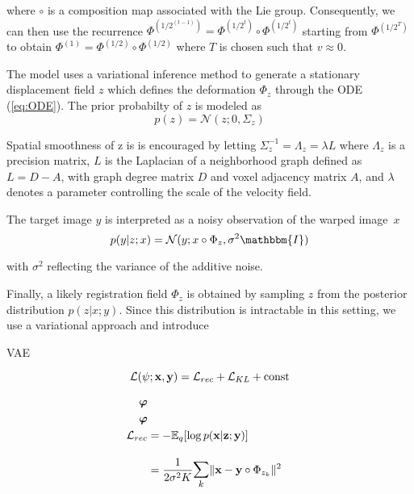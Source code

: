 where $\circ$ is a composition map associated with the Lie group. Consequently, we can then use the recurrence $\Phi^{(1/2^{(t-1)})} = \Phi^{(1/2^{t})} \circ \Phi^{(1/2^{t})}$ starting from $\Phi^{(1/2^T)}$ to obtain $\Phi^{(1)} = \Phi^{(1/2)} \circ \Phi^{(1/2)}$ where $T$ is chosen such that $v \approx 0$.

The model uses a variational inference method to generate a stationary displacement field $z$ which defines the deformation $\Phi_z$ through the ODE (\ref{eq:ODE}). The prior probabilty of $z$ is modeled as
\begin{equation}
	p(z) = \mathcal{N}(z; 0, \Sigma_z)
\end{equation}

Spatial smoothness of z is is encouraged by letting ${\Sigma_z^{-1} = \Lambda_z = \lambda L}$ where $\Lambda_z$ is a precision matrix, $L$ is the Laplacian of a neighborhood graph defined as $L = D - A$, with graph degree matrix $D$ and voxel adjacency matrix $A$, and $\lambda$ denotes a parameter controlling the scale of the velocity field.

The target image $y$ is interpreted as a noisy observation of the warped image~$x$
\begin{equation}
	p(y|z;x) = \mathcal{N}(y; x \circ \Phi_z, \sigma^2 \mathbbm{I})
\end{equation}

with $\sigma^2$ reflecting the variance of the additive noise.

Finally, a likely registration field $\Phi_z$ is obtained by sampling $z$ from the posterior distribution $p(z | x; y)$. Since this distribution is intractable in this setting, we use a variational approach and introduce 

VAE

\begin{equation}
	\mathcal{L}(\psi; \bold{x}, \bold{y}) = \mathcal{L}_{rec} + \mathcal{L}_{KL} + \text{const} 
\end{equation}


\begin{equation}
	\begin{split}
		\boldsymbol{\varphi} \\
		\boldsymbol{\phi} \\
		\mathcal{L}_{rec}
		& = -\E_{q}[ \log p( \mathbf{x} | \mathbf{z}; \mathbf{y} ) ] \\[10pt]
		& = \frac{1}{2 \sigma^2 K} \mathlarger{\sum_{k}} \norm{\mathbf{x} - \mathbf{y} \circ \Phi_{z_{k}}}^{2}
	\end{split}
\end{equation}

